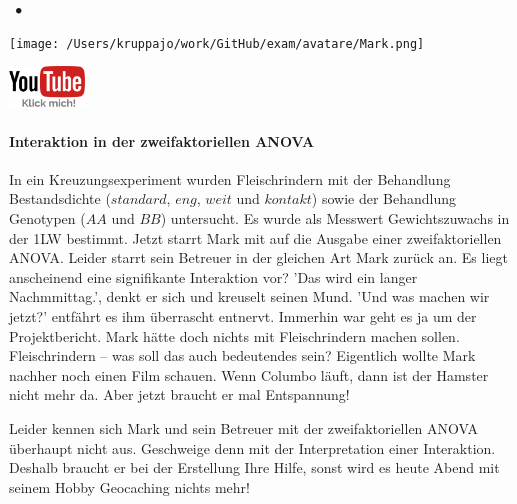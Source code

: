 \documentclass[a4paper, 9pt]{scrartcl}\usepackage[]{graphicx}\usepackage[]{xcolor}
\begin{document}
 
\ifcollection
\begin{flushright}
\tiny\vspace{-3Ex}
\textbf{\examinhaltstart}
\exammodulestatversuch $\;\bullet$
\exammodulebiostat
\vspace{-4Ex}
\end{flushright}
\begin{minipage}[t]{0.5\textwidth}
\texttt{[image: /Users/kruppajo/work/GitHub/exam/avatare/Mark.png]}
\end{minipage}
\begin{minipage}[t]{0.5\textwidth}
\hfill
\href{https://youtu.be/2qG1Dws0MJo}{\includegraphics[width = 2cm]{img/youtube}}
\end{minipage}
\vspace{-3Ex}
\fi



\ifcollection
\paragraph{Interaktion in der zweifaktoriellen ANOVA}
\fi

In ein Kreuzungsexperiment wurden Fleischrindern mit der Behandlung Bestandsdichte ($standard$, $eng$, $weit$ und $kontakt$) sowie der Behandlung Genotypen ($AA$ und $BB$) untersucht. Es wurde als Messwert Gewichtszuwachs in der 1LW bestimmt. Jetzt starrt Mark mit auf die \Rlogo Ausgabe einer zweifaktoriellen ANOVA. Leider starrt sein Betreuer in der gleichen Art Mark zurück an. Es liegt anscheinend eine signifikante Interaktion vor? 'Das wird ein langer Nachmmittag.', denkt er sich und kreuselt seinen Mund. 'Und was machen wir jetzt?' entfährt es ihm überrascht entnervt. Immerhin war geht es ja um der Projektbericht. Mark hätte doch nichts mit Fleischrindern machen sollen. Fleischrindern -- was soll das auch bedeutendes sein? Eigentlich wollte Mark nachher noch einen Film schauen. Wenn Columbo läuft, dann ist der Hamster nicht mehr da. Aber jetzt braucht er mal Entspannung!

\vspace{1ex}

Leider kennen sich Mark und sein Betreuer mit der zweifaktoriellen ANOVA überhaupt nicht aus. Geschweige denn mit der Interpretation einer Interaktion. Deshalb braucht er bei der Erstellung Ihre Hilfe, sonst wird es heute Abend mit seinem Hobby Geocaching nichts mehr! 
\end{document}
